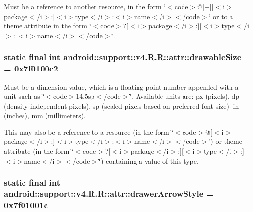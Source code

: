 Must be a reference to another resource, in the form \char`\"{}$<$code$>$@\mbox{[}+\mbox{]}\mbox{[}$<$i$>$package$<$/i$>$:\mbox{]}$<$i$>$type$<$/i$>$:$<$i$>$name$<$/i$>$$<$/code$>$\char`\"{} or to a theme attribute in the form \char`\"{}$<$code$>$?\mbox{[}$<$i$>$package$<$/i$>$:\mbox{]}\mbox{[}$<$i$>$type$<$/i$>$:\mbox{]}$<$i$>$name$<$/i$>$$<$/code$>$\char`\"{}. \hypertarget{classandroid_1_1support_1_1v4_1_1_r_1_1attr_bb8e8326bf4ae7b5807884cccc8894cb}{
\subsubsection[{drawableSize}]{\setlength{\rightskip}{0pt plus 5cm}static final int android::support::v4.R.R::attr::drawableSize = 0x7f0100c2}}
\label{classandroid_1_1support_1_1v4_1_1_r_1_1attr_bb8e8326bf4ae7b5807884cccc8894cb}


Must be a dimension value, which is a floating point number appended with a unit such as \char`\"{}$<$code$>$14.5sp$<$/code$>$\char`\"{}. Available units are: px (pixels), dp (density-independent pixels), sp (scaled pixels based on preferred font size), in (inches), mm (millimeters). 

This may also be a reference to a resource (in the form \char`\"{}$<$code$>$@\mbox{[}$<$i$>$package$<$/i$>$:\mbox{]}$<$i$>$type$<$/i$>$:$<$i$>$name$<$/i$>$$<$/code$>$\char`\"{}) or theme attribute (in the form \char`\"{}$<$code$>$?\mbox{[}$<$i$>$package$<$/i$>$:\mbox{]}\mbox{[}$<$i$>$type$<$/i$>$:\mbox{]}$<$i$>$name$<$/i$>$$<$/code$>$\char`\"{}) containing a value of this type. \hypertarget{classandroid_1_1support_1_1v4_1_1_r_1_1attr_16eb6b23bde82ceb6ed501aa6d996bae}{
\subsubsection[{drawerArrowStyle}]{\setlength{\rightskip}{0pt plus 5cm}static final int android::support::v4.R.R::attr::drawerArrowStyle = 0x7f01001c}}
\label{classandroid_1_1support_1_1v4_1_1_r_1_1attr_16eb6b23bde82ceb6ed501aa6d996bae}



